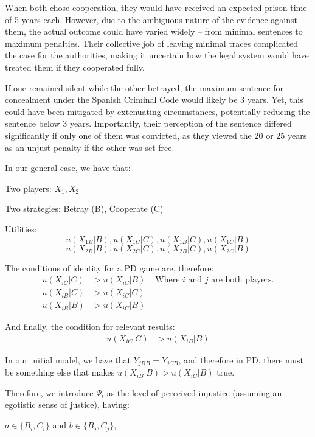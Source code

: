 \documentclass[11pt, a4paper]{article}
\begin{document}
When both chose cooperation, they would have received an expected prison time of 5 years each. However, due to the ambiguous nature of the evidence against them, the actual outcome could have varied widely – from minimal sentences to maximum penalties. Their collective job of leaving minimal traces complicated the case for the authorities, making it uncertain how the legal system would have treated them if they cooperated fully.

If one remained silent while the other betrayed, the maximum sentence for concealment under the Spanish Criminal Code would likely be 3 years. Yet, this could have been mitigated by extenuating circumstances, potentially reducing the sentence below 3 years. Importantly, their perception of the sentence differed significantly if only one of them was convicted, as they viewed the 20 or 25 years as an unjust penalty if the other was set free.

In our general case, we have that:

Two players: \(X_1, X_2\)

Two strategies: Betray (B), Cooperate (C)

Utilities: 
\[ u(X_{1B} | B), u(X_{1C} | C), u(X_{1B} | C), u(X_{1C} | B) \]
\[ u(X_{2B} | B), u(X_{2C} | C), u(X_{2B} | C), u(X_{2C} | B) \]

The conditions of identity for a PD game are, therefore:
\begin{align*}
u(X_{iC} | C) &> u(X_{iC} | B) &\text{ Where } i \text{ and } j \text{ are both players.} \\
u(X_{iB} | C) &> u(X_{iC} | C) \\
u(X_{iB} | B) &> u(X_{iC} | B)
\end{align*}

And finally, the condition for relevant results:
\begin{align*}
u(X_{iC} | C) &> u(X_{iB} | B)
\end{align*}

In our initial model, we have that $Y_{jBB} = Y_{jCB}$, and therefore in PD, there must be something else that makes $u(X_{iB} | B) > u(X_{iC} | B)$ true.

Therefore, we introduce $\Psi_i$ as the level of perceived injustice (assuming an egotistic sense of justice), having:

\begin{center}
$a \in \{ B_i, C_i \} \text{ and } b \in \{ B_j, C_j \}$,   
\end{center}
\end{document}

